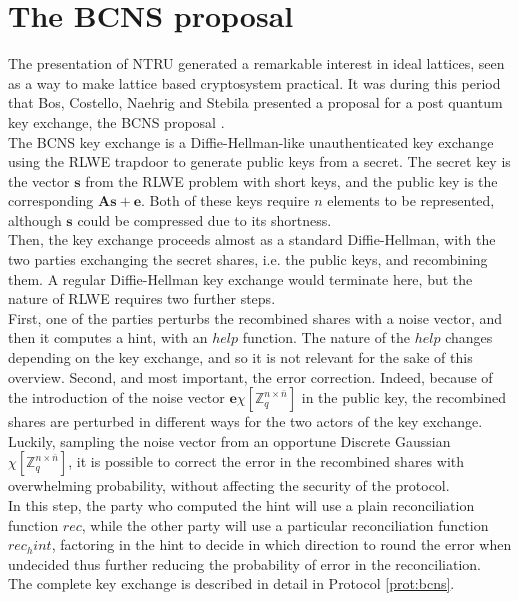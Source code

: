 \section{The BCNS proposal}
The presentation of NTRU generated a remarkable interest in ideal lattices, seen as a way to make lattice based cryptosystem practical. It was during this period that Bos, Costello, Naehrig and Stebila presented a proposal for a post quantum key exchange, the BCNS proposal \cite{BCNS}.\\
The BCNS key exchange is a Diffie-Hellman-like unauthenticated key exchange using the RLWE trapdoor to generate public keys from a secret. The secret key is the vector $\mathbf{s}$ from the RLWE problem with short keys, and the public key is the corresponding $\mathbf{A}\mathbf{s}+\mathbf{e}$. Both of these keys require $n$ elements to be represented, although $\mathbf{s}$ could be compressed due to its shortness.\\
Then, the key exchange proceeds almost as a standard Diffie-Hellman, with the two parties exchanging the secret shares, i.e. the public keys, and recombining them. A regular Diffie-Hellman key exchange would terminate here, but the nature of RLWE requires two further steps.\\
First, one of the parties perturbs the recombined shares with a noise vector, and then it computes a hint, with an $help$ function. The nature of the $help$ changes depending on the key exchange, and so it is not relevant for the sake of this overview. Second, and most important, the error correction. Indeed, because of the introduction of the noise vector $\mathbf{e}\chi[\mathbb{Z}^{n\times\bar{n}}_q]$ in the public key, the recombined shares are perturbed in different ways for the two actors of the key exchange. Luckily, sampling the noise vector from an opportune Discrete Gaussian $\chi[\mathbb{Z}^{n\times\bar{n}}_q]$, it is possible to correct the error in the recombined shares with overwhelming probability, without affecting the security of the protocol.\\
In this step, the party who computed the hint will use a plain reconciliation function $rec$, while the other party will use a particular reconciliation function $rec_hint$, factoring in the hint to decide in which direction to round the error when undecided thus further reducing the probability of error in the reconciliation. \\
The complete key exchange is described in detail in Protocol \ref{prot:bcns}.\\
